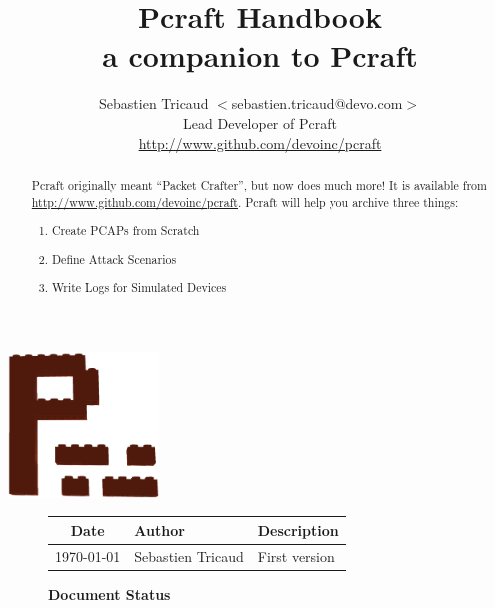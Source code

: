 \documentclass[10pt]{article}
\title{\color{PCFTorangedark} \textbf{Pcraft Handbook\\ a companion to Pcraft}}
\author{Sebastien Tricaud $<$sebastien.tricaud@devo.com$>$\\
  Lead Developer of Pcraft\\
  \url{http://www.github.com/devoinc/pcraft}
}
\begin{document}
\maketitle

\begin{center}
\includegraphics[width=4cm]{pcraft-logo.png}
\end{center}

\vspace{0.5in}

\begin{abstract}

\renewcommand{\epigraphflush}{center}
\begin{epigraphs}
\centering
\setlength{\epigraphwidth}{1.6\textwidth}
\end{epigraphs}

\vspace{1in}

Pcraft originally meant  ``Packet Crafter'', but now does much more! It is available from \url{http://www.github.com/devoinc/pcraft}. Pcraft will help you archive three things:
\begin{enumerate}
\item Create PCAPs from Scratch
\item Define Attack Scenarios
\item Write Logs for Simulated Devices
\end{enumerate}

\end{abstract}

{
\begin{figure}
\begin{center}
\caption{\textbf{Document Status}}
{
\begin{tabular}{|c|l|l|}
\hline
\textbf{Date} & \textbf{Author} & \textbf{Description} \\
\hline
\today & Sebastien Tricaud & First version \\
\hline
\end{tabular}
}
\end{center}
\end{figure}
}
\end{document}
